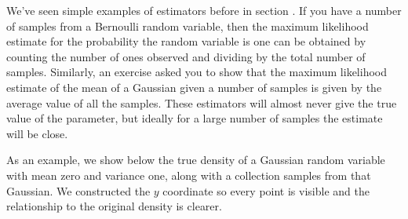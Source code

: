 \documentclass[letterpaper,11pt,english]{sphinxmanual}
\begin{document}
We’ve seen simple examples of estimators before in section
. If you have a number of samples from
a Bernoulli random variable, then the maximum likelihood estimate for
the probability the random variable is one can be obtained by counting
the number of ones observed and dividing by the total number of samples.
Similarly, an exercise asked you to show that the maximum likelihood
estimate of the mean of a Gaussian given a number of samples is given by
the average value of all the samples. These estimators will almost never
give the true value of the parameter, but ideally for a large number of
samples the estimate will be close.

As an example, we show below the true density of a Gaussian random
variable with mean zero and variance one, along with a collection
samples from that Gaussian. We constructed the \(y\) coordinate so
every point is visible and the relationship to the original density is
clearer.
\end{document}
